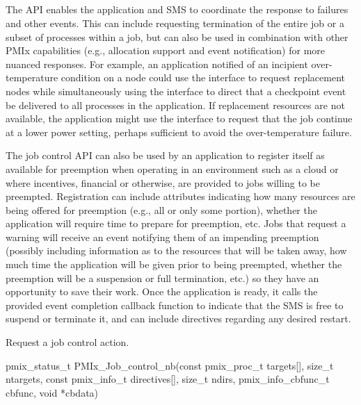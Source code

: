 \subsection{}

The  \ac{API} enables the application and \ac{SMS} to coordinate the response to failures and other events.
This can include requesting termination of the entire job or a subset of processes within a job, but can
also be used in combination with other \ac{PMIx} capabilities (e.g., allocation support and event notification) for more nuanced responses. For example, an application notified of an incipient over-temperature condition on a node could use the  interface to request replacement nodes while simultaneously using the  interface to direct that a checkpoint event be delivered to all processes in the application. If replacement resources are not available, the application might use the  interface to request that the job continue at a lower power setting, perhaps sufficient to avoid the over-temperature failure.

The job control API can also be used by an application to register itself as available for preemption when operating in an environment such as a cloud or where incentives, financial or otherwise, are provided to jobs willing to be preempted. Registration can include attributes indicating how many resources are being offered for preemption (e.g., all or only some portion), whether the application will require time to prepare for preemption, etc. Jobs that
request a warning will receive an event notifying them of an impending preemption (possibly including information as to the resources that will be taken away, how much time the application will be given prior to being preempted, whether the preemption will be a suspension or full termination, etc.) so they have an opportunity to save
their work. Once the application is ready, it calls the provided event completion callback function to indicate that
the SMS is free to suspend or terminate it, and can include directives regarding any desired restart.

\summary

Request a job control action.

\format

\cspecificstart
\begin{codepar}
pmix_status_t
PMIx_Job_control_nb(const pmix_proc_t targets[], size_t ntargets,
                    const pmix_info_t directives[], size_t ndirs,
                    pmix_info_cbfunc_t cbfunc, void *cbdata)
\end{codepar}
\cspecificend


